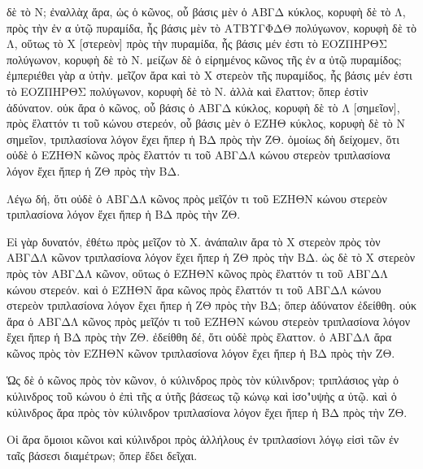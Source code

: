 \begin{Parallel}{}{}
{{δὲ τὸ Ν; ἐναλλὰχ ἄρα, ὡς ὁ κῶνος, οὗ βάσις μὲν ὁ ΑΒΓΔ κύκλος, κορυφὴ δὲ
τὸ Λ, πρὸς τὴν ἐν α ὐτῷ πυραμίδα, ἧς βάσις μὲν τὸ ΑΤΒΥΓΦΔΘ πολύγωνον, κορυφὴ
δὲ τὸ Λ, οὕτως τὸ Χ [στερεὸν] πρὸς τὴν πυραμίδα, ἧς βάσις μέν ἐστι τὸ ΕΟΖΠΗΡΘΣ
πολύγωνον, κορυφὴ δὲ τὸ Ν. μείζων δὲ ὁ εἰρημένος κῶνος τῆς ἐν α ὐτῷ
πυραμίδος; ἐμπεριέθει γὰρ α ὐτὴν. μεῖζον ἄρα καὶ τὸ Χ στερεὸν τῆς πυραμίδος, ἧς βάσις
μέν ἐστι τὸ ΕΟΖΠΗΡΘΣ πολύγωνον, κορυφὴ δὲ τὸ Ν. ἀλλὰ καὶ ἔλαττον; ὅπερ ἐστὶν ἀδύνατον.
οὐκ ἄρα ὁ κῶνος, οὗ βάσις ὁ ΑΒΓΔ κύκλος, κορυφὴ δὲ τὸ Λ [σημεῖον], πρὸς ἔλαττόν
τι τοῦ κώνου στερεόν, οὗ βάσις μὲν ὁ ΕΖΗΘ κύκλος, κορυφὴ δὲ τὸ Ν σημεῖον, τριπλασίονα
λόγον ἔχει ἤπερ ἡ ΒΔ πρὸς τὴν ΖΘ. ὁμοίως δὴ δείχομεν, ὅτι οὐδὲ ὁ ΕΖΗΘΝ κῶνος
πρὸς ἔλαττόν τι τοῦ ΑΒΓΔΛ κώνου στερεὸν τριπλασίονα λόγον ἔχει ἤπερ ἡ ΖΘ πρὸς τὴν ΒΔ.}

{\greekfont Λέγω δή, ὅτι οὐδὲ ὁ ΑΒΓΔΛ κῶνος πρὸς μεῖζόν τι τοῦ ΕΖΗΘΝ κώνου στερεὸν τριπλασίονα
λόγον ἔχει ἤπερ ἡ ΒΔ πρὸς τὴν ΖΘ.}

{\greekfont Εἰ γὰρ δυνατόν, ἐθέτω πρὸς μεῖζον τὸ Χ. ἀνάπαλιν ἄρα τὸ Χ στερεὸν πρὸς τὸν ΑΒΓΔΛ
κῶνον τριπλασίονα λόγον ἔχει ἤπερ ἡ ΖΘ πρὸς τὴν ΒΔ. ὡς δὲ τὸ Χ στερεὸν πρὸς τὸν ΑΒΓΔΛ
κῶνον, οὕτως ὁ ΕΖΗΘΝ κῶνος πρὸς ἔλαττόν τι τοῦ ΑΒΓΔΛ κώνου στερεόν. καὶ ὁ ΕΖΗΘΝ
ἄρα κῶνος πρὸς ἔλαττόν τι τοῦ ΑΒΓΔΛ κώνου στερεὸν τριπλασίονα λόγον ἔχει ἤπερ ἡ
ΖΘ πρὸς τὴν ΒΔ; ὅπερ ἀδύνατον ἐδείθθη. οὐκ ἄρα ὁ ΑΒΓΔΛ κῶνος πρὸς μεῖζόν τι
τοῦ ΕΖΗΘΝ κώνου στερεὸν τριπλασίονα λόγον ἔχει ἤπερ ἡ ΒΔ πρὸς τὴν ΖΘ. ἐδείθθη
δέ, ὅτι οὐδὲ πρὸς ἔλαττον. ὁ ΑΒΓΔΛ ἄρα κῶνος πρὸς τὸν ΕΖΗΘΝ κῶνον τριπλασίονα
λόγον ἔχει ἤπερ ἡ ΒΔ πρὸς τὴν ΖΘ.}

{\greekfont Ὡς δὲ ὁ κῶνος πρὸς τὸν κῶνον, ὁ κύλινδρος πρὸς τὸν κύλινδρον; τριπλάσιος γὰρ ὁ κύλινδρος
τοῦ κώνου ὁ ἐπὶ  τῆς α ὐτῆς βάσεως τῷ κώνῳ καὶ ἰσο"υψὴς α ὐτῷ. καὶ ὁ κύλινδρος ἄρα πρὸς τὸν
κύλινδρον τριπλασίονα λόγον ἔχει ἤπερ ἡ ΒΔ πρὸς τὴν ΖΘ.}

{\greekfont Οἱ ἄρα ὅμοιοι κῶνοι καὶ κύλινδροι πρὸς ἀλλήλους ἐν τριπλασίονι λόγῳ εἰσὶ τῶν ἐν ταῖς
βάσεσι διαμέτρων; ὅπερ ἔδει δεῖχαι.}}

\end{Parallel}
